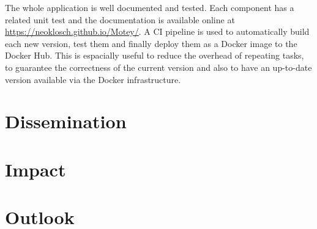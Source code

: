 The whole application is well documented and tested.
Each component has a related unit test and the documentation is available online at \url{https://neoklosch.github.io/Motey/}.
A \ac{CI} pipeline is used to automatically build each new version, test them and finally deploy them as a Docker image to the Docker Hub.
This is espacially useful to reduce the overhead of repeating tasks, to guarantee the correctness of the current version and also to have an up-to-date version available via the Docker infrastructure.

\section{Dissemination}

\doit

\section{Impact}
\label{section:summary_impact}




\doit

\section{Outlook}

\doit
